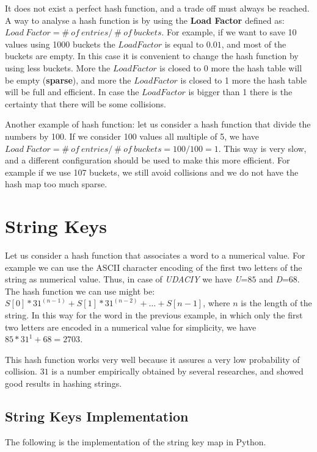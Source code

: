 It does not exist a perfect hash function, and a trade off must always be reached. A way to analyse a hash function is by using the \textbf{Load Factor} defined as: \(Load \ Factor = \# \ of \ entries / \ \# \ of \ buckets\). For example, if we want to save 10 values using 1000 buckets the \(Load Factor\) is equal to \(0.01\), and most of the buckets are empty. In this case it is convenient to change the hash function by using less buckets. More the \(Load Factor\) is closed to \(0\) more the hash table will be empty (\textbf{sparse}), and more the \(Load Factor\) is closed to 1 more the hash table will be full and efficient. In case the \(Load Factor\) is bigger than 1 there is the certainty that there will be some collisions.

Another example of hash function: let us consider a hash function that divide the numbers by 100. If we consider 100 values all multiple of 5, we have \(Load \ Factor = \# \ of \ entries / \ \# \ of \ buckets = 100/100 = 1\). This way is very slow, and a different configuration should be used to make this more efficient. For example if we use 107 buckets, we still avoid collisions and we do not have the hash map too much sparse.

\section{String Keys}
Let us consider a hash function that associates a word to a numerical value. For example we can use the ASCII character encoding of the first two letters of the string as numerical value. Thus, in case of \textit{UDACIY} we have \textit{U}=\(85\) and \textit{D}=\(68\). The hash function we can use might be: \(S\left[0\right] * 31^{(n-1)} + S\left[1\right] * 31^{(n-2)} + \ldots + S\left[n-1\right]\), where \(n\) is the length of the string. In this way for the word in the previous example, in which only the first two letters are encoded in a numerical value for simplicity, we have \(85*31^{1} + 68 = 2703\).

This hash function works very well because it assures a very low probability of collision. \(31\) is a number empirically obtained by several researches, and showed good results in hashing strings.

\subsection{String Keys Implementation}
The following is the implementation of the string key map in Python.

